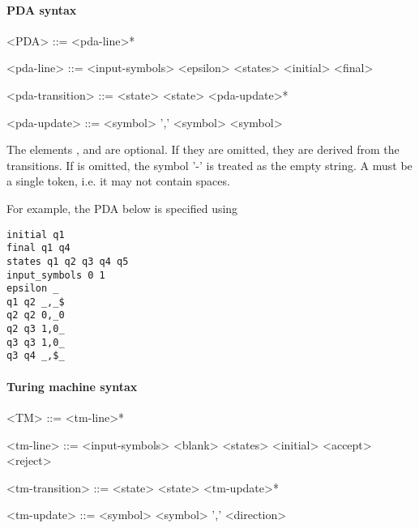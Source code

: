 \documentclass[11pt]{article}
\begin{document}
\paragraph{PDA syntax}
\begin{grammar}
<PDA> ::= <pda-line>*

<pda-line> ::= <input-symbols>
  \alt <epsilon>
  \alt <states>
  \alt <initial> 
  \alt <final> 

<pda-transition> ::= <state> <state> <pda-update>*

<pda-update> ::= <symbol> ',' <symbol> <symbol>
\end{grammar}

The elements ,  and  are optional. If they are omitted, they are derived from the transitions. If  is omitted, the symbol '-' is treated as the empty string. A  must be a single token, i.e. it may not contain spaces.

For example, the PDA below is specified using

\begin{verbatim}
initial q1
final q1 q4
states q1 q2 q3 q4 q5
input_symbols 0 1
epsilon _
q1 q2 _,_$
q2 q2 0,_0
q2 q3 1,0_
q3 q3 1,0_
q3 q4 _,$_
\end{verbatim}


\paragraph{Turing machine syntax}
\begin{grammar}
<TM> ::= <tm-line>*

<tm-line> ::= <input-symbols>
  \alt <blank>
  \alt <states>
  \alt <initial> 
  \alt <accept> 
  \alt <reject> 

<tm-transition> ::= <state> <state> <tm-update>*

<tm-update> ::= <symbol> <symbol>  ',' <direction>
\end{grammar}
\end{document}

